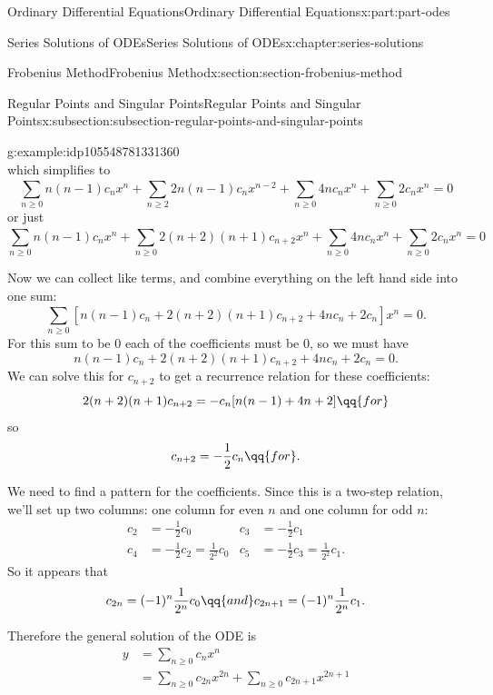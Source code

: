 \documentclass[oneside,10pt,]{book}
\numberwithin{equation}{part}
\newcommand{\amp}{&}
\begin{document}
\begin{partptx}{Ordinary Differential Equations}{}{Ordinary Differential Equations}{}{}{x:part:part-odes}
\begin{chapterptx}{Series Solutions of ODEs}{}{Series Solutions of ODEs}{}{}{x:chapter:series-solutions}
\begin{sectionptx}{Frobenius Method}{}{Frobenius Method}{}{}{x:section:section-frobenius-method}
\begin{subsectionptx}{Regular Points and Singular Points}{}{Regular Points and Singular Points}{}{}{x:subsection:subsection-regular-points-and-singular-points}
\begin{example}{}{g:example:idp105548781331360}
\begin{equation*}
\end{equation*}
which simplifies to%
\begin{equation*}
\sum_{n\geq0}^{}n(n-1)c_{n}x^{n}+\sum_{n\geq2}^{}2n(n-1)c_{n}x^{n-2}+\sum_{n\geq0}^{}4nc_{n}x^{n}+\sum_{n\geq0}^{}2c_{n}x^{n} = 0
\end{equation*}
or just%
\begin{equation*}
\sum_{n\geq0}^{}n(n-1)c_{n}x^{n}+\sum_{n\geq0}^{}2(n+2)(n+1)c_{n+2}x^{n}+\sum_{n\geq0}^{}4nc_{n}x^{n}+\sum_{n\geq0}^{}2c_{n}x^{n} = 0
\end{equation*}
%
\par
Now we can collect like terms, and combine everything on the left hand side into one sum:%
\begin{equation*}
\sum_{n\geq0}^{}\left[n(n-1)c_{n}+2(n+2)(n+1)c_{n+2}+4nc_{n}+2c_{n}\right]x^{n} = 0.
\end{equation*}
For this sum to be \(0\) each of the coefficients must be \(0\), so we must have%
\begin{equation*}
n(n-1)c_{n}+2(n+2)(n+1)c_{n+2}+4nc_{n}+2c_{n} = 0.
\end{equation*}
We can solve this for \(c_{n+2}\) to get a recurrence relation for these coefficients:%
\begin{equation*}
2(n+2)(n+1)c_{n+2} = -c_{n}[n(n-1)+4n+2] \qq{for }
\end{equation*}
so%
\begin{equation*}
c_{n+2} = -\frac{1}{2}c_{n}\qq{for }.
\end{equation*}
%
\par
We need to find a pattern for the coefficients. Since this is a two-step relation, we'll set up two columns: one column for even \(n\) and one column for odd \(n\):%
\begin{align*}
c_{2} \amp= -\frac{1}{2}c_{0} \amp c_{3} \amp= -\frac{1}{2}c_{1}\\
c_{4} \amp= -\frac{1}{2}c_{2} = \frac{1}{2^{2}}c_{0} \amp c_{5} \amp= -\frac{1}{2}c_{3} = \frac{1}{2^{2}}c_{1}\text{.}
\end{align*}
So it appears that%
\begin{equation*}
c_{2n} = (-1)^{n}\frac{1}{2^{n}}c_{0}\qq{and}c_{2n+1} = (-1)^{n}\frac{1}{2^{n}}c_{1}\text{.}
\end{equation*}
%
\par
Therefore the general solution of the ODE is%
\begin{align*}
y \amp= \sum_{n\geq0}^{}c_{n}x^{n}\\
\amp= \sum_{n\geq0}c_{2n}x^{2n} + \sum_{n\geq0}c_{2n+1}x^{2n+1}\\

\end{align*}
\end{example}
\end{subsectionptx}
\end{sectionptx}
\end{chapterptx}
\end{partptx}
\end{document}
